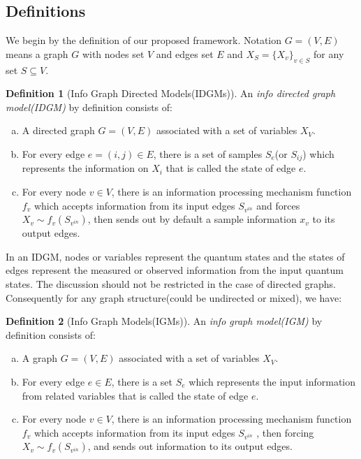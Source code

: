 \documentclass{article}
\theoremstyle{definition}
\newtheorem{definition}{Definition}[section]
\theoremstyle{remark}
\theoremstyle{definition}
\begin{document}
\begin{CJK*}{UTF8}{gbsn}
\subsection{Definitions}

We begin by the definition of our proposed framework. Notation $G=(V, E)$ means a graph $G$ with nodes set $V$ and edges set $E$ and $X_S = \{X_v\}_{v\in S}$ for any set $S\subseteq V$.

\begin{definition}[Info Graph Directed Models(IDGMs)]
    An \emph{info directed graph model(IDGM)} by definition consists of:
    \begin{enumerate}[a)]
        \item  A directed graph $G = (V, E)$ associated with a set of variables $X_V$. 
        \item  For every edge $e=(i, j) \in E$, there is a set of samples $S_e$(or $S_{ij}$) which represents the information on $X_i$ that is called the state of edge $e$. 
        \item  For every node $v \in V$, there is an information processing mechanism function $f_v$ which accepts information from its input edges $S_{v^{in}}$ and forces $X_v \sim f_v(S_{v^{in}})$, then sends out by default a sample information $x_v$ to its output edges. 
    \end{enumerate}  
\end{definition}


In an IDGM, nodes or variables  represent the quantum states and the states of edges represent the measured or observed information from the input quantum states. The discussion should not be restricted in the case of directed graphs. Consequently for any graph structure(could be undirected or mixed), we have:

\begin{definition}[Info Graph Models(IGMs)]
    An \emph{info graph model(IGM)} by definition consists of:
    \begin{enumerate}[a)]
        \item  A graph $G = (V, E)$ associated with a set of variables $X_V$. 
        \item  For every edge $e \in E$, there is a set $S_e$ which represents the input information from related variables that is called the state of edge $e$. 
        \item  For every node $v \in V$, there is an information processing mechanism function $f_v$ which accepts information from its input edges $S_{v^{in}}$ , then forcing $X_v \sim f_v(S_{v^{in}})$, and sends out information to its output edges. 
    \end{enumerate}  
\end{definition}


\end{CJK*}
\end{document}

